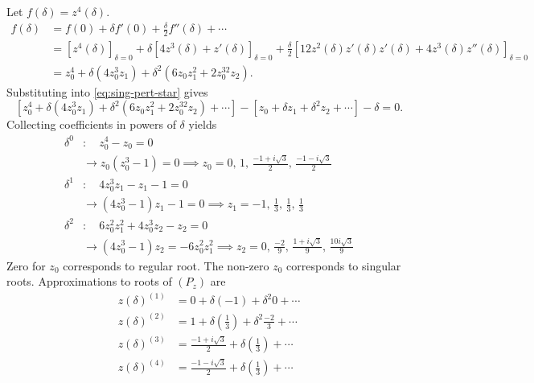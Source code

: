 \documentclass[12pt,twoside]{article}
\begin{document}
Let $f(\delta) = z^4(\delta)$.
\begin{equation*}
  \begin{aligned}
    f(\delta) &= f(0) + \delta f'(0) + \frac{\delta}{2}f''(\delta) + \cdots \\
    &= \left[ z^4(\delta) \right]_{\delta=0} + \delta \left[
      4z^3(\delta)+z'(\delta) \right]_{\delta=0} + \frac{\delta}{2}\left[
      12z^2(\delta)z'(\delta)z'(\delta) + 4z^3(\delta)z''(\delta)
    \right]_{\delta=0} \\
    &= z_0^4+\delta(4z_0^3z_1) + \delta^2(6z_0z_1^2+2z_0^32z_2).
  \end{aligned}
\end{equation*}
Substituting into \cref{eq:sing-pert-star} gives
\begin{equation*}
  \left[ z_0^4+\delta(4z_0^3z_1) + \delta^2(6z_0z_1^2+2z_0^32z_2) + \cdots \right]
  -\left[ z_0 + \delta z_1 + \delta^2 z_2 + \cdots \right]
  -\delta = 0.
\end{equation*}
Collecting coefficients in powers of $\delta$ yields
\begin{equation*}
  \begin{aligned}
    \delta^0 &:\quad z_0^4-z_0=0
    \\ &\rightarrow z_0(z_0^3-1)=0
    \implies z_0=0,\,1,\,\frac{-1+i\sqrt{3}}{2},\,\frac{-1-i\sqrt{3}}{2} \\
    \delta^1 &:\quad 4z_0^3z_1 - z_1-1=0
    \\ &\rightarrow (4z_0^3-1)z_1-1=0
    \implies z_1=-1,\,\frac{1}{3},\,\frac{1}{3},\,\frac{1}{3} \\
    \delta^2 &:\quad 6z_0^2z_1^2+4z_0^3z_2-z_2=0
    \\ &\rightarrow (4z_0^3-1)z_2=-6z_0^2z_1^2
    \implies z_2=0,\,\frac{-2}{9},\,\frac{1+i\sqrt{3}}{9},\,\frac{10i\sqrt{3}}{9}
  \end{aligned}
\end{equation*}
Zero for $z_0$ corresponds to regular root. The non-zero $z_0$ corresponds to
singular roots. Approximations to roots of $(P_z)$ are
\begin{equation*}
  \begin{aligned}
    z(\delta)^{(1)} &= 0 + \delta(-1) + \delta^2{0} + \cdots \\
    z(\delta)^{(2)} &= 1 + \delta\left(\frac{1}{3}\right) + \delta^2{\frac{-2}{3}} + \cdots \\
    z(\delta)^{(3)} &= \frac{-1+i\sqrt{3}}{2} + \delta\left( \frac{1}{3} \right) + \cdots \\
    z(\delta)^{(4)} &= \frac{-1-i\sqrt{3}}{2} + \delta\left( \frac{1}{3} \right) + \cdots \\
  \end{aligned}
\end{equation*}
\end{document}
